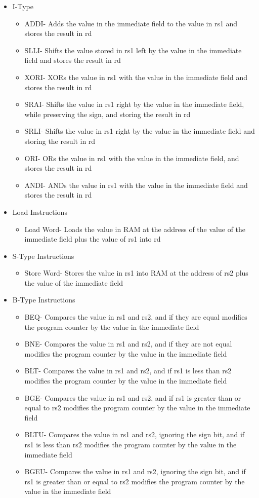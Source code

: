 \documentclass[10pt,letterpaper]{article}
\begin{document}
\begin{itemize}
	\item I-Type
	\begin{itemize}
		\item ADDI- Adds the value in the immediate field to the value in rs1 and stores the result in rd
		\item SLLI- Shifts the value stored in rs1 left by the value in the immediate field and stores the result in rd
		\item XORI- XORs the value in rs1 with the value in the immediate field and stores the result in rd
		\item SRAI- Shifts the value in rs1 right by the value in the immediate field, while preserving the sign, and storing the result in rd
		\item SRLI- Shifts the value in rs1 right by the value in the immediate field and storing the result in rd
		\item ORI- ORs the value in rs1 with the value in the immediate field, and stores the result in rd
		\item ANDI- ANDs the value in rs1 with the value in the immediate field and stores the result in rd
	\end{itemize}
	\item Load Instructions
	\begin{itemize}
		\item Load Word- Loads the value in RAM at the address of the value of the immediate field plus the value of rs1 into rd
	\end{itemize}
	\item S-Type Instructions
	\begin{itemize}
		\item Store Word- Stores the value in rs1 into RAM at the address of rs2 plus the value of the immediate field
	\end{itemize}
	\item B-Type Instructions
	\begin{itemize}
		\item BEQ- Compares the value in rs1 and rs2, and if they are equal modifies the program counter by the value in the immediate field
		\item BNE-  Compares the value in rs1 and rs2, and if they are not equal modifies the program counter by the value in the immediate field
		\item BLT- Compares the value in rs1 and rs2, and if rs1 is less than rs2 modifies the program counter by the value in the immediate field
		\item BGE- Compares the value in rs1 and rs2, and if rs1 is greater than or equal to rs2 modifies the program counter by the value in the immediate field
		\item BLTU- Compares the value in rs1 and rs2, ignoring the sign bit, and if rs1 is less than rs2 modifies the program counter by the value in the immediate field
		\item BGEU- Compares the value in rs1 and rs2, ignoring the sign bit, and if rs1 is greater than or equal to rs2 modifies the program counter by the value in the immediate field
	\end{itemize}
\end{itemize}
\newpage
\end{document}
